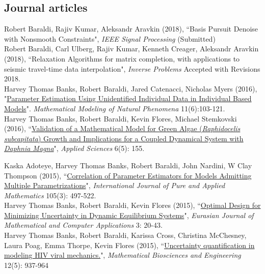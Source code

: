 \documentclass[10pt, a4paper]{article}
\newcommand{\years}[1]{\marginnote{\scriptsize #1}}
\begin{document}
\subsection*{Journal articles}
\noindent
\years{2018} Robert Baraldi, Rajiv Kumar, Aleksandr Aravkin  (2018), “Basis Pursuit Denoise with Nonsmooth Constraints", \emph{IEEE Signal Processing} (Submitted)\\
\years{2018a} Robert Baraldi, Carl Ulberg, Rajiv Kumar, Kenneth Creager, Aleksandr Aravkin (2018), “Relaxation Algorithms for matrix completion, with applications to seismic travel-time data interpolation", \emph{Inverse Problems} Accepted with Revisions 2018.\\
\years{2016a} Harvey Thomas Banks, Robert Baraldi, Jared Catenacci, Nicholas Myers (2016), "\href{https://www.ncsu.edu/crsc/reports/ftp/pdf/crsc-tr16-04.pdf}{Parameter Estimation Using Unidentified Individual Data in Individual Based Models}". \emph{Mathematical Modeling of Natural Phenomena} 11(6):103-121.\\
\years{2016b} Harvey Thomas Banks, Robert Baraldi, Kevin Flores, Michael Stemkovski (2016), “\href{http://www.mdpi.com/2076-3417/6/5/155/htm}{Validation of a Mathematical Model for Green Algae (\emph{Raphidocelis subcapitata}) Growth and Implications for a Coupled Dynamical System with \emph{Daphnia Magna}}", \emph{Applied Sciences} 6(5): 155. 

\years{2015a}Kaska Adoteye, Harvey Thomas Banks, Robert Baraldi, John Nardini, W Clay Thompson (2015), “\href{http://www.ijpam.eu/contents/2015-105-3/16/16.pdf}{Correlation of Parameter Estimators for Models Admitting Multiple Parametrizations}", \emph{International Journal of Pure and Applied Mathematics} 105(3): 497-522.\\
\years{2015b}Harvey Thomas Banks, Robert Baraldi, Kevin Flores (2015), “\href{http://www.ncsu.edu/crsc/reports/ftp/pdf/crsc-tr15-03.pdf}{Optimal Design for Minimizing Uncertainty in Dynamic Equilibrium Systems}", \emph{Eurasian Journal of Mathematical and Computer Applications} 3: 20-43.\\
\years{2015c}Harvey Thomas Banks, Robert Baraldi, Karissa Cross, Christina McChesney, Laura Poag, Emma Thorpe, Kevin Flores (2015), “\href{http://aimsciences.org/journals/displayArticlesnew.jsp?paperID=11300}{Uncertainty quantification in modeling HIV viral mechanics.}", \emph{Mathematical Biosciences and Engineering} 12(5): 937-964\\
\end{document}
